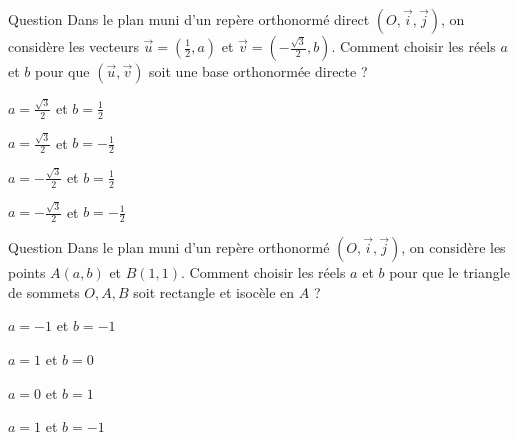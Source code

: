 \begin{multi}[multiple,feedback=
{D'abord, \(\displaystyle \|\vec{u}\|=1\Leftrightarrow a=\frac{\pm \sqrt{3}}{2}\), \(\displaystyle \|\vec{v}\|=1\Leftrightarrow b=\frac{\pm 1}{2}\) et \(\vec{u}\cdot\vec{v}=0\) si, et seulement si, \(a\) et \(b\) sont de même signe. Enfin pour que \((\vec{u},\vec{v})\) soit directe, il faut que \(\mbox{det}(\vec{u},\vec{v})\) soit positif.
}]{Question}
Dans le plan muni d'un repère orthonormé direct \((O,\vec{i},\vec{j})\), on considère les vecteurs \(\displaystyle \vec{u}=\left(\frac{1}{2},a\right)\) et \(\displaystyle \vec{v}=\left(-\frac{\sqrt{3}}{2},b\right)\). Comment choisir les réels \(a\) et \(b\) pour que \((\vec{u},\vec{v})\) soit une base orthonormée directe ?

    \item* \(\displaystyle a=\frac{\sqrt{3}}{2}\) et \(\displaystyle b=\frac{1}{2}\)
    \item \(\displaystyle a=\frac{\sqrt{3}}{2}\) et \(\displaystyle b=-\frac{1}{2}\)
    \item \(\displaystyle a=-\frac{\sqrt{3}}{2}\) et \(\displaystyle b=\frac{1}{2}\)
    \item \(\displaystyle a=-\frac{\sqrt{3}}{2}\) et \(\displaystyle b=-\frac{1}{2}\)
\end{multi}


\begin{multi}[multiple,feedback=
{On doit avoir \(\displaystyle \|\overrightarrow{OA}\|=\|\overrightarrow{AB}\|\) et \(\overrightarrow{OA}\cdot\overrightarrow{AB}=0\). Ceci donne (\(a=1\) et \(b=0\)) ou (\(a=0\) et \(b=1\)).
}]{Question}
Dans le plan muni d'un repère orthonormé \((O,\vec{i},\vec{j})\), on considère les points \(\displaystyle A(a,b)\) et \(\displaystyle B(1,1)\). Comment choisir les réels \(a\) et \(b\) pour que le triangle de sommets \(O,A,B\) soit rectangle et isocèle en \(A\) ?

    \item \(\displaystyle a=-1\) et \(\displaystyle b=-1\)
    \item* \(\displaystyle a=1\) et \(\displaystyle b=0\)
    \item* \(\displaystyle a=0\) et \(\displaystyle b=1\)
    \item \(\displaystyle a=1\) et \(\displaystyle b=-1\)
\end{multi}



